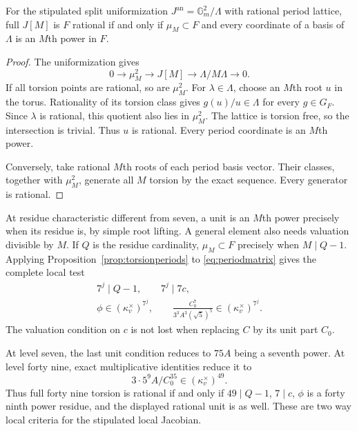 \begin{proposition}\label{prop:torsionperiods}
For the stipulated split uniformization $J^{\mathrm{an}}=\mathbb G_m^2/\Lambda$ with rational period lattice, full $J[M]$ is $F$ rational if and only if $\mu_M\subset F$ and every coordinate of a basis of $\Lambda$ is an $M$th power in $F$.
\end{proposition}
\begin{proof}
The uniformization gives
\[
0\longrightarrow\mu_M^2\longrightarrow J[M]
\longrightarrow\Lambda/M\Lambda\longrightarrow0.
\]
If all torsion points are rational, so are $\mu_M^2$. For $\lambda\in\Lambda$, choose an $M$th root $u$ in the torus. Rationality of its torsion class gives $g(u)/u\in\Lambda$ for every $g\in G_F$. Since $\lambda$ is rational, this quotient also lies in $\mu_M^2$. The lattice is torsion free, so the intersection is trivial. Thus $u$ is rational. Every period coordinate is an $M$th power.

Conversely, take rational $M$th roots of each period basis vector. Their classes, together with $\mu_M^2$, generate all $M$ torsion by the exact sequence. Every generator is rational.
\end{proof}
At residue characteristic different from seven, a unit is an $M$th power precisely when its residue is, by simple root lifting. A general element also needs valuation divisible by $M$. If $Q$ is the residue cardinality, $\mu_M\subset F$ precisely when $M\mid Q-1$. Applying Proposition~\ref{prop:torsionperiods} to \eqref{eq:periodmatrix} gives the complete local test
\begin{equation}\label{eq:full-local-torsion}
\begin{gathered}
7^j\mid Q-1,\qquad7^j\mid7c,\\
\phi\in(\kappa_v^\times)^{7^j},\qquad
\frac{C_0^7}{3^3A^3(\sqrt5)^5}\in(\kappa_v^\times)^{7^j}.
\end{gathered}
\end{equation}
The valuation condition on $c$ is not lost when replacing $C$ by its unit part $C_0$.

At level seven, the last unit condition reduces to $75A$ being a seventh power. At level forty nine, exact multiplicative identities reduce it to
\[
3\cdot5^9A/C_0^{35}\in(\kappa_v^\times)^{49}.
\]
Thus full forty nine torsion is rational if and only if $49\mid Q-1$, $7\mid c$, $\phi$ is a forty ninth power residue, and the displayed rational unit is as well. These are two way local criteria for the stipulated local Jacobian.


